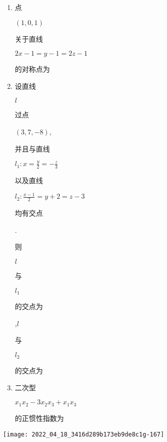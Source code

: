 \documentclass[10pt]{article}
\begin{document}
\begin{enumerate}
  \item \begin{CJK}{UTF8}{mj}点\end{CJK} $(1,0,1)$ \begin{CJK}{UTF8}{mj}关于直线\end{CJK} $2 x-1=y-1=2 z-1$ \begin{CJK}{UTF8}{mj}的对称点为\end{CJK}

  \item \begin{CJK}{UTF8}{mj}设直线\end{CJK} $l$ \begin{CJK}{UTF8}{mj}过点\end{CJK} $(3,7,-8)$, \begin{CJK}{UTF8}{mj}并且与直线\end{CJK} $l_{1}: x=\frac{y}{2}=-\frac{z}{3}$ \begin{CJK}{UTF8}{mj}以及直线\end{CJK} $l_{2}: \frac{x-1}{2}=y+2=z-3$ \begin{CJK}{UTF8}{mj}均有交点\end{CJK}. \begin{CJK}{UTF8}{mj}则\end{CJK} $l$ \begin{CJK}{UTF8}{mj}与\end{CJK} $l_{1}$ \begin{CJK}{UTF8}{mj}的交点为\end{CJK} ,$l$ \begin{CJK}{UTF8}{mj}与\end{CJK} $l_{2}$ \begin{CJK}{UTF8}{mj}的交点为\end{CJK}

  \item \begin{CJK}{UTF8}{mj}二次型\end{CJK} $x_{1} x_{2}-3 x_{2} x_{3}+x_{1} x_{3}$ \begin{CJK}{UTF8}{mj}的正惯性指数为\end{CJK}

\end{enumerate}
\texttt{[image: 2022\_04\_18\_3416d289b173eb9de8c1g-167]}
\end{document}
